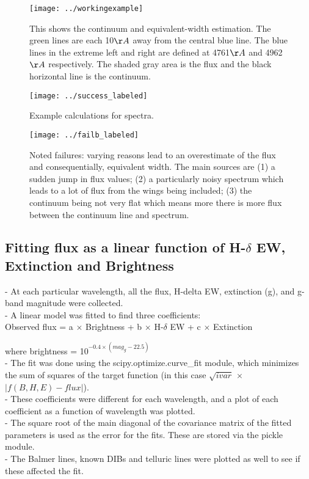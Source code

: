 \documentclass[manuscript]{aastex}
\begin{document}
\begin{figure}
\texttt{[image: ../workingexample]}\\
\caption{This shows the continuum and equivalent-width estimation. The green lines are each 10$\AA$  away from the central blue line. The blue lines in the extreme left and right are defined at 4761$\AA$ and 4962$\AA$  respectively. The shaded gray area is the flux and the black horizontal line is the continuum.}
\end{figure}
\begin{figure}
\texttt{[image: ../success\_labeled]}\\
\caption{Example calculations for spectra.}
\end{figure}
\begin{figure}
\texttt{[image: ../failb\_labeled]}\\
\caption{Noted failures: varying reasons lead to an overestimate of the flux and consequentially, equivalent width. The main sources are (1) a sudden jump in flux values; (2) a particularly noisy spectrum which leads to a lot of flux from the wings being included; (3) the continuum being not very flat which means more there is more flux between the continuum line and spectrum.}
\end{figure}

\subsection{Fitting flux as a linear function of H-$\delta$ EW, Extinction and Brightness}
- At each particular wavelength, all the flux, H-delta EW, extinction (g), and g-band magnitude were collected. \\
- A linear model was fitted to find three coefficients:\\
Observed flux = a $\times$ Brightness + b $\times$ H-$\delta$  EW + c $\times$ Extinction

 where brightness = 10$^{-0.4 \times (mag_g - 22.5)}$\\
- The fit was done using the scipy.optimize.curve\_fit module, which minimizes the sum of squares of the target function (in this case $\sqrt{ivar}$ $\times$ $|f(B,H,E)-flux|$).
\\
- These coefficients were different for each wavelength, and a plot of each coefficient as a function of wavelength was plotted.\\
- The square root of the main diagonal of the covariance matrix of the fitted parameters is used as the error for the fits. These are stored via the pickle module.\\
- The Balmer lines, known DIBs and telluric lines were plotted as well to see if these affected the fit.
\end{document}
